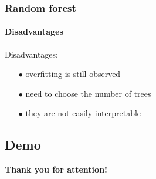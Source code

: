 \begin{frame}
	\frametitle{Random forest}
		\framesubtitle{Disadvantages}

		Disadvantages:
		\begin{itemize}
		  \item[$\bullet$] overfitting is still observed 
		  \item[$\bullet$] need to choose the number of trees
		  \item[$\bullet$] they are not easily interpretable
		\end{itemize}

\end{frame}

\subsection{Demo} %

\begin{frame}
	
	\begin{center}
		\Huge \textbf{Thank you for attention!}
	\end{center}

\end{frame}
